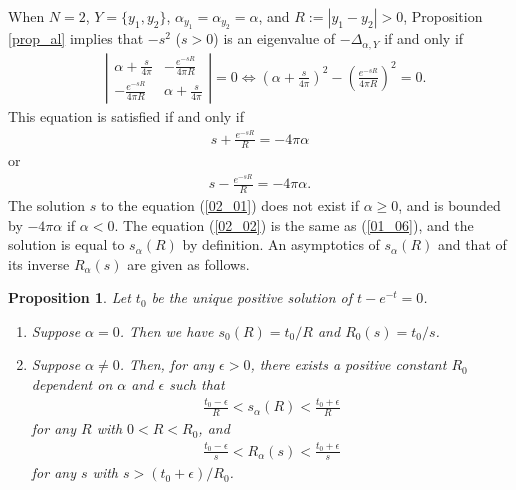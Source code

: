 \documentclass[12pt,a4paper]{article}
\newtheorem{proposition}[theorem]{Proposition}
\begin{document}
When $N=2$, $Y=\{y_1,y_2\}$,
$\alpha_{y_1}=\alpha_{y_2}=\alpha$,
and $R:=|y_1-y_2|>0$,
Proposition \ref{prop_al} implies that 
$-s^2$ ($s>0$) is an eigenvalue of $-\Delta_{\alpha,Y}$
if and only if
\begin{align*}
&
\left|
\begin{matrix}
\displaystyle
 \alpha + \frac{s}{4\pi} & 
\displaystyle
-\frac{e^{-sR}}{4\pi R}\\[3mm]
\displaystyle
-\frac{e^{-sR}}{4\pi R} & 
\displaystyle
\alpha + \frac{s}{4\pi}
\end{matrix}
\right|
=0
\Leftrightarrow
\left(\alpha+\frac{s}{4\pi}\right)^2-\left(\frac{e^{-sR}}{4\pi R}\right)^2=0.
\end{align*}
This equation is satisfied if and only if
\begin{align}
s+\frac{e^{-sR}}{R}=-4\pi\alpha
\label{02_01}
\end{align}
or
\begin{align}
s-\frac{e^{-sR}}{R}=-4\pi\alpha.
\label{02_02}
\end{align}
The solution $s$ to the equation (\ref{02_01})
does not exist if $\alpha \geq 0$,
and is bounded by $-4\pi \alpha$ if $\alpha<0$.
The equation (\ref{02_02}) is the same as
(\ref{01_06}), and 
the solution is equal to $s_\alpha(R)$ by definition.
An asymptotics of $s_\alpha(R)$ 
and that of its inverse $R_\alpha(s)$ are given as follows.
\begin{proposition}
\label{prop_ev2}
Let 
$t_0$ be the unique positive solution of
$t-e^{-t}=0$. 
\begin{enumerate}
  \item[(1)] Suppose $\alpha=0$.
Then we have
$s_0(R)=t_0/R$
and
$R_0(s)=t_0/s$.



  \item[(2)] Suppose $\alpha\not=0$.
Then, for any $\epsilon>0$,
there exists a positive constant $R_0$ dependent on $\alpha$ and
$\epsilon$
such that
\begin{align}
\label{02_03}
\frac{t_0-\epsilon}{R}<s_\alpha(R)<\frac{{t_0+\epsilon}}{R}
\end{align}
for any $R$ with $0<R<R_0$,
and 
\begin{align}
\label{02_04}
 \frac{t_0-\epsilon}{s}<
R_\alpha(s)<\frac{t_0+\epsilon}{s}
\end{align}
for any $s$ with $s>(t_0+\epsilon)/R_0$.
 \end{enumerate}
\end{proposition}
\end{document}

